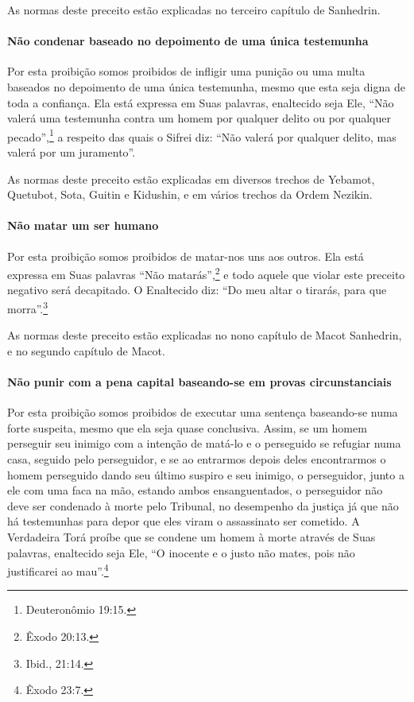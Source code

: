As normas deste preceito estão explicadas no terceiro capítulo de Sanhedrin.

\paragraph{Não condenar baseado no depoimento de uma única testemunha}

Por esta proibição somos proibidos de infligir uma punição ou uma multa
baseados no depoimento de uma única testemunha, mesmo que esta seja
digna de toda a confiança. Ela está expressa em Suas palavras,
enaltecido seja Ele, ``Não valerá uma testemunha contra um homem por
qualquer delito ou por qualquer pecado'',\footnote{Deuteronômio 19:15.} a
respeito das quais o Sifrei diz: ``Não valerá por qualquer delito, mas
valerá por um juramento''.

As normas deste preceito estão explicadas em diversos trechos de
Yebamot, Quetubot, Sota, Guitin e Kidushin, e em vários trechos da Ordem
Nezikin.

\paragraph{Não matar um ser humano}

Por esta proibição somos proibidos de matar-nos uns aos
outros. Ela está expressa em Suas palavras ``Não matarás'',\footnote{Êxodo
20:13.} e todo aquele que violar este preceito negativo será decapitado.
O Enaltecido diz: ``Do meu altar o tirarás, para que morra''.\footnote{Ibid., 21:14.}

As normas deste preceito estão explicadas no nono capítulo de Macot
Sanhedrin, e no segundo capítulo de Macot.


\paragraph{Não punir com a pena capital baseando-se em provas circunstanciais}

Por esta proibição somos proibidos de executar uma sentença baseando-se
numa forte suspeita, mesmo que ela seja quase conclusiva. Assim, se um
homem perseguir seu inimigo com a intenção de matá-lo e o perseguido se
refugiar numa casa, seguido pelo perseguidor, e se ao entrarmos depois
deles encontrarmos o homem perseguido dando seu último suspiro e seu
inimigo, o perseguidor, junto a ele com uma faca na mão, estando ambos
ensanguentados, o perseguidor não deve ser condenado à morte pelo
Tribunal, no desempenho da justiça já que não há testemunhas para depor
que eles viram o assassinato ser cometido. A Verdadeira Torá proíbe que
se condene um homem à morte através de Suas palavras, enaltecido seja
Ele, ``O inocente e o justo não mates, pois não justificarei ao mau''.\footnote{Êxodo 23:7.}

